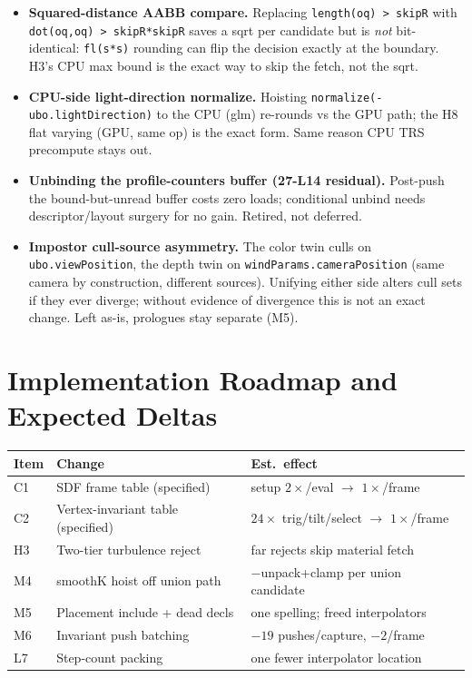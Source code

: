 \documentclass[11pt,a4paper]{article}
\begin{document}
\begin{itemize}[leftmargin=1.4em,itemsep=2pt]
\item \textbf{Squared-distance AABB compare.} Replacing
\texttt{length(oq) > skipR} with \texttt{dot(oq,oq) > skipR*skipR} saves a
sqrt per candidate but is \emph{not} bit-identical: \texttt{fl(s*s)}
rounding can flip the decision exactly at the boundary. H3's CPU max bound
is the exact way to skip the fetch, not the sqrt.
\item \textbf{CPU-side light-direction normalize.} Hoisting
\texttt{normalize(-ubo.lightDirection)} to the CPU (glm) re-rounds vs the
GPU path; the H8 flat varying (GPU, same op) is the exact form. Same reason
CPU TRS precompute stays out.
\item \textbf{Unbinding the profile-counters buffer (27-L14 residual).}
Post-push the bound-but-unread buffer costs zero loads; conditional unbind
needs descriptor/layout surgery for no gain. Retired, not deferred.
\item \textbf{Impostor cull-source asymmetry.} The color twin culls on
\texttt{ubo.viewPosition}, the depth twin on
\texttt{windParams.cameraPosition} (same camera by construction, different
sources). Unifying either side alters cull sets if they ever diverge;
without evidence of divergence this is not an exact change. Left as-is,
prologues stay separate (M5).
\end{itemize}

\section{Implementation Roadmap and Expected Deltas}

\begin{table}[h]
\centering
\small
\begin{tabular}{@{}lp{5.8cm}p{5.6cm}@{}}
\toprule
\textbf{Item} & \textbf{Change} & \textbf{Est.\ effect} \\
\midrule
C1 & SDF frame table (specified) & setup $2\times$/eval $\rightarrow$ $1\times$/frame \\
C2 & Vertex-invariant table (specified) & $24\times$ trig/tilt/select $\rightarrow$ $1\times$/frame \\
H3 & Two-tier turbulence reject & far rejects skip material fetch \\
M4 & smoothK hoist off union path & $-$unpack+clamp per union candidate \\
M5 & Placement include + dead decls & one spelling; freed interpolators \\
M6 & Invariant push batching & $-19$ pushes/capture, $-2$/frame \\
L7 & Step-count packing & one fewer interpolator location \\
\bottomrule
\end{tabular}
\end{table}
\end{document}
